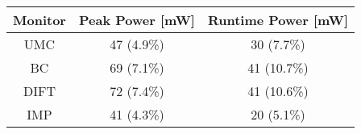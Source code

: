 

\begin{tabular}{|c|c|c|}
\hline

{\bf Monitor} & {\bf Peak Power [mW]} & {\bf Runtime Power [mW]} \\ \hline\hline

UMC  & 47 (4.9\%) & 30 (7.7\%) \\ \hline
BC   & 69 (7.1\%) & 41 (10.7\%) \\ \hline
DIFT & 72 (7.4\%) & 41 (10.6\%) \\ \hline
IMP  & 41 (4.3\%) & 20 (5.1\%) \\ \hline

\end{tabular}
